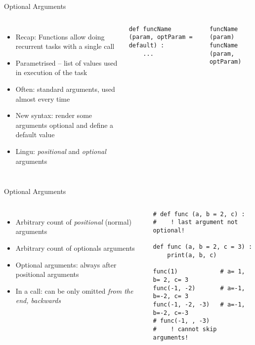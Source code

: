 \begin{frame}[fragile]{Optional Arguments}
%
\begin{columns}[T]
\begin{itemize}
\item Recap: Functions allow doing recurrent tasks with a single call
\item Parametrised -- list of values used in execution of the task
\item Often: standard arguments, used almost every time
\item New syntax: render some arguments optional and define a default value
\item Lingu: \emph{positional} and \emph{optional} arguments
\end{itemize}
%
\begin{codebox}
\begin{verbatim}
def funcName (param, optParam = default) :
    ...
\end{verbatim}
\end{codebox}
%
\begin{codebox}
\begin{verbatim}
funcName (param)
funcName (param, optParam)
\end{verbatim}
\end{codebox}
\end{columns}
%
\end{frame}


\begin{frame}[fragile]{Optional Arguments}
%
\begin{columns}[T]
\begin{itemize}
\item Arbitrary count of \emph{positional} (normal) arguments
\item Arbitrary count of optionals arguments
\item Optional arguments: always after positional arguments
\item In a call: can be only omitted \emph{from the end, backwards}
\end{itemize}
%
\begin{codebox}
\begin{verbatim}
# def func (a, b = 2, c) :
#    ! last argument not optional!

def func (a, b = 2, c = 3) :
    print(a, b, c)
    
func(1)            # a= 1, b= 2, c= 3
func(-1, -2)       # a=-1, b=-2, c= 3
func(-1, -2, -3)   # a=-1, b=-2, c=-3
# func(-1, , -3)
#    ! cannot skip arguments!
\end{verbatim}
\end{codebox}
\end{columns}
%
\end{frame}

